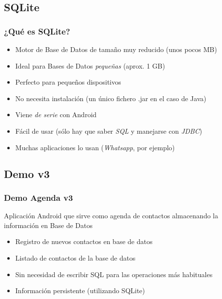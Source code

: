 \documentclass[xcolor={dvipsnames}]{beamer}
\begin{document}
\subsection{SQLite}
\begin{frame}\frametitle{¿Qué es SQLite?}
    \begin{itemize}
        \item Motor de Base de Datos de tamaño muy reducido (unos pocos MB)
        \item Ideal para Bases de Datos \emph{pequeñas} (aprox. 1 GB)
        \item Perfecto para pequeños dispositivos
        \item No necesita instalación (un único fichero .jar en el caso de Java)
        \item Viene \emph{de serie} con Android
        \item Fácil de usar (sólo hay que saber \emph{SQL} y manejarse con \emph{JDBC})
        \item Muchas aplicaciones lo usan (\emph{Whatsapp}, por ejemplo)
    \end{itemize}
\end{frame}

\subsection{Demo v3}
\begin{frame}\frametitle{Demo Agenda v3}
    
    Aplicación Android que sirve como agenda de contactos almacenando la información en Base de Datos

    \begin{itemize}
        \item Registro de nuevos contactos en base de datos
        \item Listado de contactos de la base de datos
        \item Sin necesidad de escribir SQL para las operaciones más habituales
        \item Información persistente (utilizando SQLite)
    \end{itemize}
\end{frame}
\end{document}
